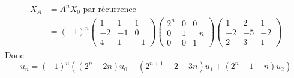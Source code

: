 \documentclass{article}
\begin{document}
\begin{align*}
  X_A &= A^n X_0 \text{ par récurrence}\\
      &= (-1)^{n} \begin{pmatrix}
        1 & 1 & 1 \\ -2 & -1 & 0 \\ 4 & 1 & -1
      \end{pmatrix}\begin{pmatrix}
        2^n & 0 & 0 \\ 0 & 1 & -n\\ 0 & 0 & 1
      \end{pmatrix}\begin{pmatrix}
        1 & 2 & 1 \\ -2 & -5 & -2 \\ 2 & 3 & 1
      \end{pmatrix} 
\end{align*}
Donc 
\begin{equation*}
  u_n = (-1)^{n}((2^n - 2n)u_0 + (2^{n+1}-2-3n)u_1 + (2^n-1-n)u_2)
\end{equation*}
\end{document}
